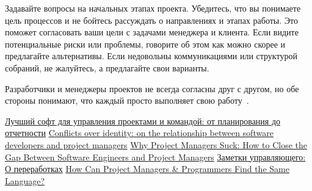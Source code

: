 \documentclass[]{../industrial-development}
\begin{document}
Задавайте вопросы на начальных этапах проекта. Убедитесь, что вы понимаете цель процессов и не бойтесь рассуждать о направлениях и этапах работы. Это поможет согласовать ваши цели с задачами менеджера и клиента. Если видите потенциальные риски или проблемы, говорите об этом как можно скорее и предлагайте альтернативы. Если недовольны коммуникациями или структурой собраний, не жалуйтесь, а предлагайте свои варианты.

Разработчики и менеджеры проектов не всегда согласны друг с другом, но обе стороны понимают, что каждый просто выполняет свою работу~\cite{Codementor}.

\begin{thebibliography}{99}
 \href{https://netology.ru/blog/soft-dlya-upravleniya}{Лучший софт для управления проектами и командой: от планирования до отчетности}
 \href{https://eight2late.wordpress.com/2010/03/04/conflicts-over-identity-on-the-relationship-between-software-developers-and-project-managers/}{Conflicts over identity: on the relationship between software developers and project managers}
 \href{https://www.codementor.io/blog/project-manager-developer-collaboration-36xk9axtps}{Why Project Managers Suck: How to Close the Gap Between Software Engineers and Project Managers}
 \href{https://netology.ru/blog/zametki-upravlyayushchego-o-pererabotkakh}{Заметки управляющего: 
 О переработках}
 \href{https://www.knowledgehut.com/blog/project-management/can-project-managers-programmers-find-language}{How Can Project Managers \& Programmers Find the Same Language?}

\end{thebibliography}
\end{document}
